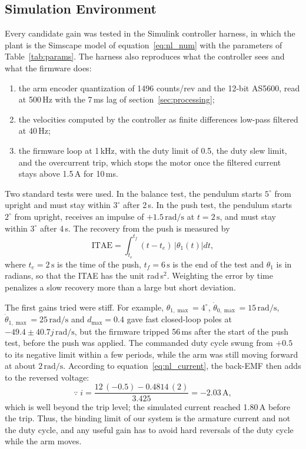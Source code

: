 \documentclass[a4paper,11pt]{article}
\begin{document}
\subsection{Simulation Environment}
\label{sec:lqr_sim}
Every candidate gain was tested in the Simulink controller harness, in which the plant is the Simscape model of equation~\ref{eq:nl_num} with the parameters of Table~\ref{tab:params}. The harness also reproduces what the controller sees and what the firmware does:
\begin{enumerate}
  \item the arm encoder quantization of 1496 counts/rev and the 12-bit AS5600, read at 500\,Hz with the 7\,ms lag of section~\ref{sec:processing};
  \item the velocities computed by the controller as finite differences low-pass filtered at 40\,Hz;
  \item the firmware loop at 1\,kHz, with the duty limit of 0.5, the duty slew limit, and the overcurrent trip, which stops the motor once the filtered current stays above 1.5\,A for 10\,ms.
\end{enumerate}
Two standard tests were used. In the balance test, the pendulum starts $5^\circ$ from upright and must stay within $3^\circ$ after 2\,s. In the push test, the pendulum starts $2^\circ$ from upright, receives an impulse of $+1.5\,\mathrm{rad/s}$ at $t = 2\,\mathrm{s}$, and must stay within $3^\circ$ after 4\,s. The recovery from the push is measured by
\begin{equation}
  \mathrm{ITAE} = \int_{t_e}^{t_f} (t - t_e)\, \left|\theta_1(t)\right| dt ,
  \label{eq:itae}
\end{equation}
where $t_e = 2\,\mathrm{s}$ is the time of the push, $t_f = 6\,\mathrm{s}$ is the end of the test and $\theta_1$ is in radians, so that the ITAE has the unit rad\,s$^2$. Weighting the error by time penalizes a slow recovery more than a large but short deviation.

The first gains tried were stiff. For example, $\theta_{1,\max} = 4^\circ$, $\dot\theta_{0,\max} = 15\,\mathrm{rad/s}$, $\dot\theta_{1,\max} = 25\,\mathrm{rad/s}$ and $d_{\max} = 0.4$ gave fast closed-loop poles at $-49.4 \pm 40.7j\,\mathrm{rad/s}$, but the firmware tripped 56\,ms after the start of the push test, before the push was applied. The commanded duty cycle swung from $+0.5$ to its negative limit within a few periods, while the arm was still moving forward at about $2\,\mathrm{rad/s}$. According to equation~\ref{eq:nl_current}, the back-EMF then adds to the reversed voltage:
\begin{equation}
  \because\; i = \frac{12\,(-0.5) - 0.4814\,(2)}{3.425} = -2.03\,\mathrm{A} ,
\end{equation}
which is well beyond the trip level; the simulated current reached 1.80\,A before the trip. Thus, the binding limit of our system is the armature current and not the duty cycle, and any useful gain has to avoid hard reversals of the duty cycle while the arm moves.
\end{document}

